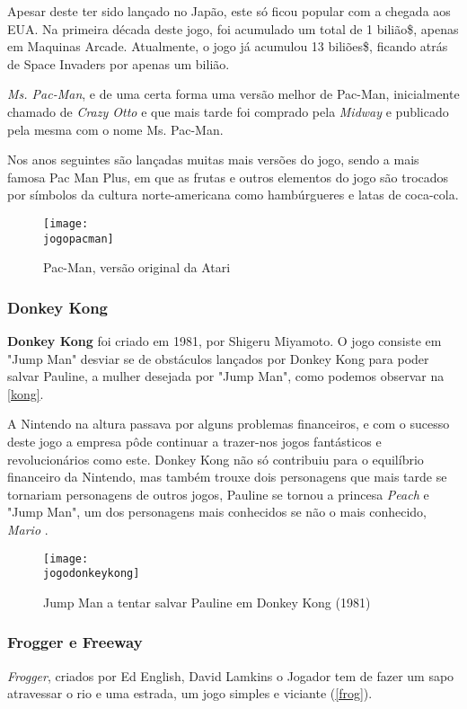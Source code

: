 \documentclass{report}
\begin{document}
Apesar deste ter sido lançado no Japão, este só ficou popular com a chegada aos EUA. Na primeira década deste jogo, foi acumulado um total de 1 bilião\$, apenas em Maquinas Arcade. Atualmente, o jogo já acumulou 13 biliões\$, ficando atrás de Space Invaders por apenas um bilião.

\textit{Ms. Pac-Man}, e de uma certa forma uma versão melhor de Pac-Man, inicialmente chamado de \textit{Crazy Otto} e que mais tarde foi comprado pela \textit{Midway} e publicado pela mesma com o nome Ms. Pac-Man.

Nos anos seguintes são lançadas muitas mais versões do jogo, sendo a mais famosa  Pac Man Plus, em que as frutas e outros elementos do jogo são trocados por símbolos da cultura norte-americana como hambúrgueres e latas de coca-cola.

\begin{figure}[h]
\center
\texttt{[image: \\jogopacman]}
\caption{Pac-Man, versão original da Atari \cite{pacman}}
\label{pac}
\end{figure}


\subsubsection{Donkey Kong}
\label{subsubsec.Donkey Kong}
\textbf{Donkey Kong} foi criado em 1981, por  Shigeru Miyamoto. O jogo consiste em "Jump Man" desviar se de obstáculos lançados por Donkey Kong para poder salvar Pauline, a mulher desejada por "Jump Man", como podemos observar na \autoref{kong}.

A Nintendo na altura passava por alguns problemas financeiros, e com o sucesso deste jogo a empresa pôde continuar a trazer-nos jogos fantásticos e revolucionários como este.
Donkey Kong não só contribuiu para o equilíbrio financeiro da Nintendo, mas também trouxe dois personagens que mais tarde se tornariam personagens de outros jogos, Pauline se tornou a princesa \textit{Peach} e "Jump Man", um dos personagens mais conhecidos se não o mais conhecido, \textit{Mario} .

\begin{figure}[h]
\center
\texttt{[image: \\jogodonkeykong]}
\caption{Jump Man a tentar salvar Pauline em Donkey Kong (1981) \cite{donkeykong}}
\label{kong}
\end{figure}

\subsubsection{Frogger e Freeway}
\label{subsubsec.Frogger e Freeway}
\textit{Frogger}, criados por Ed English, David Lamkins o Jogador tem de fazer um sapo atravessar o rio e uma estrada, um jogo simples e viciante (\autoref{frog}).
\end{document}
